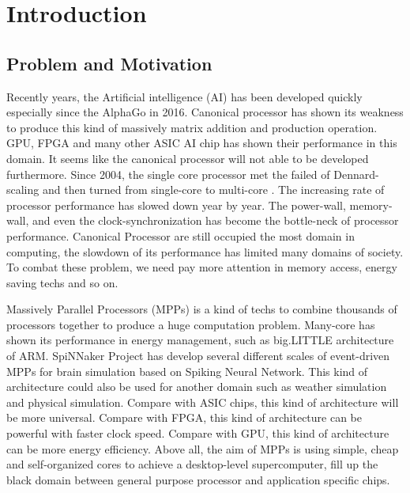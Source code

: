 \chapter{Introduction}
\section{Problem and Motivation}

\par Recently years, the Artificial intelligence (AI) has been developed quickly especially since the AlphaGo \citep{silver2016mastering} in 2016. Canonical processor has shown its weakness to produce this kind of massively matrix addition and production operation. GPU, FPGA and many other ASIC AI chip has shown their performance in this domain. It seems like the canonical processor will not able to be developed furthermore. Since 2004, the single core processor met the failed of Dennard-scaling and then turned from single-core to multi-core \citep{hennessy2017computer}. The increasing rate of processor performance has slowed down year by year\citep{hennessy2017computer}. The power-wall, memory-wall, and even the clock-synchronization has become the bottle-neck of processor performance. Canonical Processor are still occupied the most domain in computing, the slowdown of its performance has limited many domains of society. To combat these problem, we need pay more attention in memory access, energy saving techs and so on.

\par Massively Parallel Processors (MPPs) is a kind of techs to combine thousands of processors together to produce a huge computation problem. Many-core has shown its performance in energy management\cite{borkar2007thousand}, such as big.LITTLE architecture of ARM\cite{padoin2014performance}. SpiNNaker Project\cite{furber2013overview}\cite{furber2014spinnaker} has develop several different scales of event-driven MPPs for brain simulation based on Spiking Neural Network. This kind of architecture could also be used for another domain such as weather simulation and physical simulation. Compare with ASIC chips, this kind of architecture will be more universal. Compare with FPGA, this kind of architecture can be powerful with faster clock speed. Compare with GPU, this kind of architecture can be more energy efficiency. Above all, the aim of MPPs is using simple, cheap and self-organized cores to achieve a desktop-level supercomputer, fill up the black domain between general purpose processor and application specific chips. 

